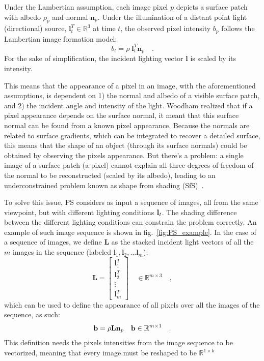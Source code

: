 Under the Lambertian assumption, each image pixel $p$ depicts a surface patch with albedo $\rho_p$ and normal $\mathbf{n}_p$. Under the illumination of a distant point light (directional) source, $\mathbf{l}_t^T \in \mathbb{R}^3$ at time $t$, the observed pixel intensity $b_p$ follows the Lambertian image formation model:
\begin{equation}
b_t =  \rho \; \mathbf{l}_t^T \mathbf{n}_p \quad.
\end{equation}
For the sake of simplification, the incident lighting vector $\mathbf{l}$ is scaled by its intensity.

This means that the appearance of a pixel in an image, with the aforementioned assumptions, is dependent on 1) the normal and albedo of a visible surface patch, and 2) the incident angle and intensity of the light. Woodham realized that if a pixel appearance depends on the surface normal, it meant that this surface normal can be found from a known pixel appearance. Because the normals are related to surface gradients, which can be integrated to recover a detailed surface, this means that the shape of an object (through its surface normals) could be obtained by observing the pixels appearance. But there's a problem: a single image of a surface patch (a pixel) cannot explain all three degrees of freedom of the normal to be reconstructed (scaled by its albedo), leading to an underconstrained problem known as shape from shading (SfS)~\cite{Horn1989}.

To solve this issue, PS considers as input a sequence of images, all from the same viewpoint, but with different lighting conditions ${\bf l}_t$. The shading difference between the different lighting conditions can constrain the problem correctly. An example of such image sequence is shown in fig.~\ref{fig:PS_example}. In the case of a sequence of images, we define $\mathbf{L}$ as the stacked incident light vectors of all the $m$ images in the sequence (labeled $\mathbf{l}_{1}, \mathbf{l}_{2}, \dots \mathbf{l}_{m}$):
\begin{equation}
\label{eq:Ldef}
\mathbf{L} =
\begin{bmatrix}
    \mathbf{l}_{1}^T \\
    \mathbf{l}_{2}^T \\
    \vdots \\
    \mathbf{l}_{m}^T
\end{bmatrix}
\quad
\in \mathbb{R}^{m \times 3} \quad,
\end{equation}
which can be used to define the appearance of all pixels over all the images of the sequence, as such:
\begin{equation}
\label{eq:lamb_refl}
\mathbf{b} =  \rho \mathbf{L} \mathbf{n}_p \quad {\bf b} \in \mathbb{R}^{m \times 1} \quad.
\end{equation}
This definition needs the pixels intensities from the image sequence to be vectorized, meaning that every image must be reshaped to be $\mathbb{R}^{1 \times k}$

